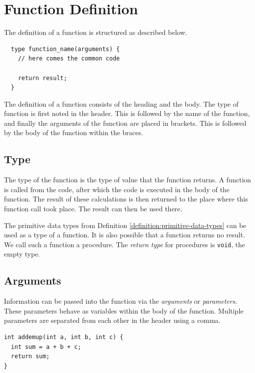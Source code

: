 \documentclass[11pt,fleqn]{book} %
\begin{document}
\section{Function Definition}
The definition of a function is structured as described below.
\begin{definition}[Function]
	\phantom{ }
	\begin{verbatim}
  type function_name(arguments) {
    // here comes the common code

    return result;
  }
	\end{verbatim}
	\vspace{0cm}
\end{definition}
\noindent
The definition of a function consists of the heading and the body. The type of function is first noted in the header. This is followed by the name of the function, and finally the arguments of the function are placed in brackets. This is followed by the body of the function within the braces.

\subsection{Type}
The type of the function is the type of value that the function returns. A function is called from the code, after which the code is executed in the body of the function. The result of these calculations is then returned to the place where this function call took place. The result can then be used there.

The primitive data types from Definition \ref{definition:primitive-data-types} can be used as a type of a function. It is also possible that a function returns no result. We call such a function a procedure. The \emph{return type} for procedures is \texttt{void}, the empty type.



\subsection{Arguments}
Information can be passed into the function via the \emph{arguments} or \emph{parameters}. These parameters behave as variables within the body of the function. Multiple parameters are separated from each other in the header using a comma.

\begin{example}
	\phantom{ }
	\begin{verbatim}
int addemup(int a, int b, int c) {
  int sum = a + b + c;
  return sum;
}
	\end{verbatim}
\end{example}
\end{document}
